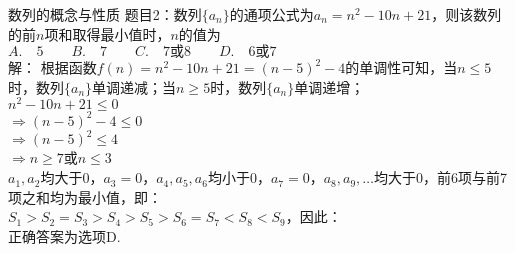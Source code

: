 \documentclass[aspectratio=169]{ctexbeamer} %
\date{\today}
\begin{document}
\begin{frame}[t]{数列的概念与性质}
题目2：数列$\{a_n\}$的通项公式为$a_n = n^2 - 10n + 21$，则该数列的前$n$项和取得最小值时，$n$的值为\\
$A. \quad 5 \qquad B. \quad 7 \qquad C. \quad 7\text{或}8 \qquad D. \quad 6\text{或}7$ \\
\pause
解：
\pause
根据函数$f(n) = n^2 - 10n + 21 = (n-5)^2 -4$的单调性可知，当$n \le 5$时，数列$\{a_n\}$单调递减；当$n \ge 5$时，数列$\{a_n\}$单调递增；\\
\pause
$n^2 - 10n + 21 \le 0$ \\
\pause
$\Rightarrow (n-5)^2 - 4 \le 0$ \\
\pause
$\Rightarrow (n-5)^2 \le 4$ \\
\pause
$\Rightarrow n \ge 7$或$n \le 3$ \\
\pause
$a_1, a_2$均大于0，$a_3 = 0$，$a_4, a_5, a_6$均小于0，$a_7 = 0$，$a_8, a_9, \dots$均大于0，前6项与前7项之和均为最小值，即：\\
\pause
$S_1 > S_2 = S_3 > S_4 > S_5 > S_6 = S_7 < S_8 < S_9$，因此：\\
\pause
正确答案为选项D.
\end{frame}
\end{document}
